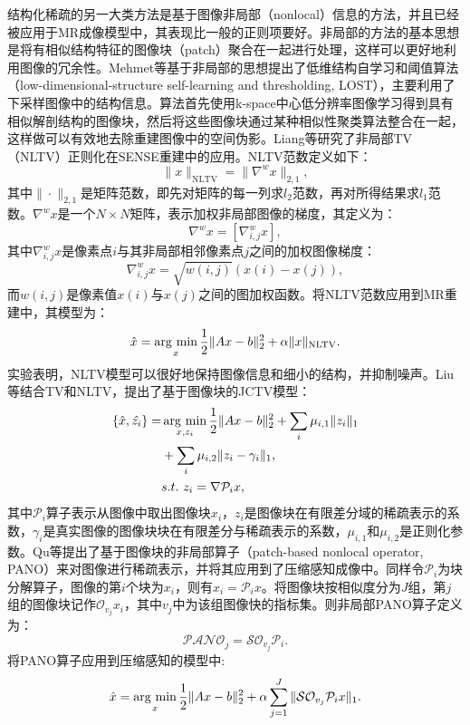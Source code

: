 结构化稀疏的另一大类方法是基于图像非局部（nonlocal）\cite{peyre2008non,lou2010image,gilboa2008nonlocal}信息的方法，并且已经被应用于MR成像模型中，其表现比一般的正则项要好。非局部的方法的基本思想是将有相似结构特征的图像块（patch）聚合在一起进行处理，这样可以更好地利用图像的冗余性。Mehmet等\cite{akccakaya2011low}基于非局部的思想提出了低维结构自学习和阈值算法（low-dimensional-structure self-learning and thresholding, LOST），主要利用了下采样图像中的结构信息。算法首先使用k-space中心低分辨率图像学习得到具有相似解剖结构的图像块，然后将这些图像块通过某种相似性聚类算法整合在一起，这样做可以有效地去除重建图像中的空间伪影。Liang等\cite{liang2011sensitivity}研究了非局部TV（NLTV）正则化在SENSE重建中的应用。NLTV范数定义如下：
$$\|x\|_{\mathrm{NLTV}}=\|\nabla^wx\|_{2,1},$$
其中$\|\cdot\|_{2,1}$是矩阵范数，即先对矩阵的每一列求$l_2$范数，再对所得结果求$l_1$范数。$\nabla^wx$是一个$N\times N$矩阵，表示加权非局部图像的梯度，其定义为：
$$\nabla^wx=[\nabla^w_{i,j}x],$$
其中$\nabla^w_{i,j}x$是像素点$i$与其非局部相邻像素点$j$之间的加权图像梯度：
$$\nabla^w_{i,j}x=\sqrt{w(i,j)}(x(i)-x(j)),$$
而$w(i,j)$是像素值$x(i)$与$x(j)$之间的图加权函数。将NLTV范数应用到MR重建中，其模型为：
\begin{equation}
	\hat{x}=\argmin_x \frac{1}{2}\|Ax-b\|^2_2+\alpha\|x\|_{\mathrm{NLTV}}.
\end{equation}
实验表明，NLTV模型可以很好地保持图像信息和细小的结构，并抑制噪声。Liu\cite{liu2017mri}等结合TV和NLTV，提出了基于图像块的JCTV模型：
\begin{equation}
\begin{aligned}
	\{\hat{x},\hat{z_i}\}=&\argmin_{x,z_i}\frac{1}{2}\|Ax-b\|_2^2+\sum_i\mu_{i,1}\|z_i\|_1\\
	&+\sum_i\mu_{i,2}\|z_i-\gamma_i\|_1,\\
	&s.t.\ z_i=\nabla\mathcal{P}_ix,
\end{aligned}
\end{equation}
其中$\mathcal{P}_i$算子表示从图像中取出图像块$x_i$，$z_i$是图像块在有限差分域的稀疏表示的系数，$\gamma_i$是真实图像的图像块块在有限差分与稀疏表示的系数，$\mu_{i,1}$和$\mu_{i,2}$是正则化参数。Qu等\cite{qu2014magnetic}提出了基于图像块的非局部算子（patch-based nonlocal operator, PANO）来对图像进行稀疏表示，并将其应用到了压缩感知成像中。同样令$\mathcal{P}_i$为块分解算子，图像的第$i$个块为$x_i$，则有$x_i=\mathcal{P}_ix$。将图像块按相似度分为$J$组，第$j$组的图像块记作$\mathcal{O}_{v_j}x_i$，其中$v_j$中为该组图像快的指标集。则非局部PANO算子定义为：
$$\mathcal{PANO}_j=\mathcal{S}\mathcal{O}_{v_j}\mathcal{P}_i.$$
将PANO算子应用到压缩感知的模型中:
\begin{equation}
	\hat{x}=\argmin_x \frac{1}{2}\|Ax-b\|_2^2 + \alpha\sum^J_{j=1}\|\mathcal{S}\mathcal{O}_{v_j}\mathcal{P}_ix\|_1.
\end{equation}
